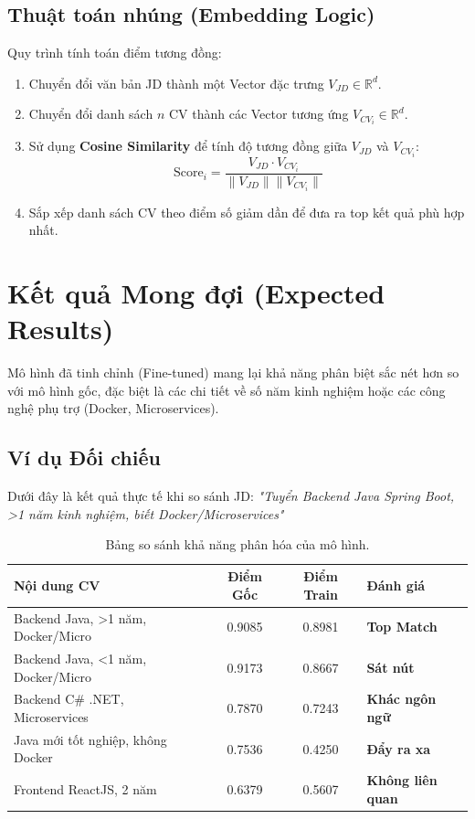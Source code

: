 \documentclass[12pt, a4paper]{article}
\begin{document}
\subsection{Thuật toán nhúng (Embedding Logic)}
Quy trình tính toán điểm tương đồng:
\begin{enumerate}
    \item Chuyển đổi văn bản JD thành một Vector đặc trưng $V_{JD} \in \mathbb{R}^d$.
    \item Chuyển đổi danh sách $n$ CV thành các Vector tương ứng $V_{CV_i} \in \mathbb{R}^d$.
    \item Sử dụng \textbf{Cosine Similarity} để tính độ tương đồng giữa $V_{JD}$ và $V_{CV_i}$:
    \begin{equation}
        \text{Score}_i = \frac{V_{JD} \cdot V_{CV_i}}{\|V_{JD}\| \|V_{CV_i}\|}
    \end{equation}
    \item Sắp xếp danh sách CV theo điểm số giảm dần để đưa ra top kết quả phù hợp nhất.
\end{enumerate}

\section{Kết quả Mong đợi (Expected Results)}
Mô hình đã tinh chỉnh (Fine-tuned) mang lại khả năng phân biệt sắc nét hơn so với mô hình gốc, đặc biệt là các chi tiết về số năm kinh nghiệm hoặc các công nghệ phụ trợ (Docker, Microservices).

\subsection{Ví dụ Đối chiếu}
Dưới đây là kết quả thực tế khi so sánh JD: \textit{"Tuyển Backend Java Spring Boot, >1 năm kinh nghiệm, biết Docker/Microservices"}

\begin{table}[h!]
\centering
\begin{tabular}{|l|c|c|l|}
\hline
\textbf{Nội dung CV} & \textbf{Điểm Gốc} & \textbf{Điểm Train} & \textbf{Đánh giá} \\ \hline
Backend Java, >1 năm, Docker/Micro & 0.9085 & 0.8981 & \textbf{Top Match} \\ \hline
Backend Java, <1 năm, Docker/Micro & 0.9173 & 0.8667 & \textbf{Sát nút} \\ \hline
Backend C\# .NET, Microservices & 0.7870 & 0.7243 & \textbf{Khác ngôn ngữ} \\ \hline
Java mới tốt nghiệp, không Docker & 0.7536 & 0.4250 & \textbf{Đẩy ra xa} \\ \hline
Frontend ReactJS, 2 năm & 0.6379 & 0.5607 & \textbf{Không liên quan} \\ \hline
\end{tabular}
\caption{Bảng so sánh khả năng phân hóa của mô hình.}
\end{table}
\end{document}
